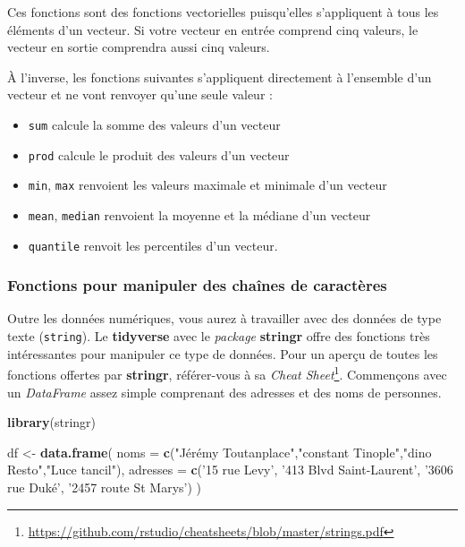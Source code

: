 \documentclass[
  11pt,
  french,
]{book}
\makeatletter
\newenvironment{Shaded}{\begin{snugshade}}{\end{snugshade}}
\newcommand{\DataTypeTok}[1]{\textcolor[rgb]{0.13,0.29,0.53}{#1}}
\newcommand{\KeywordTok}[1]{\textcolor[rgb]{0.13,0.29,0.53}{\textbf{#1}}}
\newcommand{\NormalTok}[1]{#1}
\newcommand{\StringTok}[1]{\textcolor[rgb]{0.31,0.60,0.02}{#1}}
\providecommand{\tightlist}{%
  \setlength{\itemsep}{0pt}\setlength{\parskip}{0pt}}
\renewcommand{\href}[2]{#2\footnote{\url{#1}}}
\newenvironment{kframe}{%
\medskip{}
\setlength{\fboxsep}{.8em}
 \def\at@end@of@kframe{}%
 \ifinner\ifhmode%
  \def\at@end@of@kframe{\end{minipage}}%
  \begin{minipage}{\columnwidth}%
 \fi\fi%
 \def\FrameCommand##1{\hskip\@totalleftmargin \hskip-\fboxsep
 \colorbox{shadecolor}{##1}\hskip-\fboxsep
     \hskip-\linewidth \hskip-\@totalleftmargin \hskip\columnwidth}%
 \MakeFramed {\advance\hsize-\width
   \@totalleftmargin\z@ \linewidth\hsize
   \@setminipage}}%
 {\par\unskip\endMakeFramed%
 \at@end@of@kframe}
\renewenvironment{Shaded}{\begin{kframe}}{\end{kframe}}
\makeatother
\begin{document}
Ces fonctions sont des fonctions vectorielles puisqu'elles s'appliquent à tous les éléments d'un vecteur. Si votre vecteur en entrée comprend cinq valeurs, le vecteur en sortie comprendra aussi cinq valeurs.

À l'inverse, les fonctions suivantes s'appliquent directement à l'ensemble d'un vecteur et ne vont renvoyer qu'une seule valeur :

\begin{itemize}
\tightlist
\item
  \texttt{sum} calcule la somme des valeurs d'un vecteur
\item
  \texttt{prod} calcule le produit des valeurs d'un vecteur
\item
  \texttt{min}, \texttt{max} renvoient les valeurs maximale et minimale d'un vecteur
\item
  \texttt{mean}, \texttt{median} renvoient la moyenne et la médiane d'un vecteur
\item
  \texttt{quantile} renvoit les percentiles d'un vecteur.
\end{itemize}

\hypertarget{sect01425}{%
\subsubsection{Fonctions pour manipuler des chaînes de caractères}\label{sect01425}}

Outre les données numériques, vous aurez à travailler avec des données de type texte (\texttt{string}). Le \textbf{tidyverse} avec le \emph{package} \textbf{stringr} offre des fonctions très intéressantes pour manipuler ce type de données. Pour un aperçu de toutes les fonctions offertes par \textbf{stringr}, référer-vous à sa \href{https://github.com/rstudio/cheatsheets/blob/master/strings.pdf}{\emph{Cheat Sheet}}. Commençons avec un \emph{DataFrame} assez simple comprenant des adresses et des noms de personnes.

\begin{Shaded}
\begin{Highlighting}[]
\KeywordTok{library}\NormalTok{(stringr)}

\NormalTok{df <-}\StringTok{ }\KeywordTok{data.frame}\NormalTok{(}
  \DataTypeTok{noms =} \KeywordTok{c}\NormalTok{(}\StringTok{"Jérémy Toutanplace"}\NormalTok{,}\StringTok{"constant Tinople"}\NormalTok{,}\StringTok{"dino Resto"}\NormalTok{,}\StringTok{"Luce tancil"}\NormalTok{),}
  \DataTypeTok{adresses =} \KeywordTok{c}\NormalTok{(}\StringTok{'15 rue Levy'}\NormalTok{, }\StringTok{'413 Blvd Saint-Laurent'}\NormalTok{, }\StringTok{'3606 rue Duké'}\NormalTok{, }\StringTok{'2457 route St Marys'}\NormalTok{)}
\NormalTok{)}
\end{Highlighting}
\end{Shaded}
\end{document}
